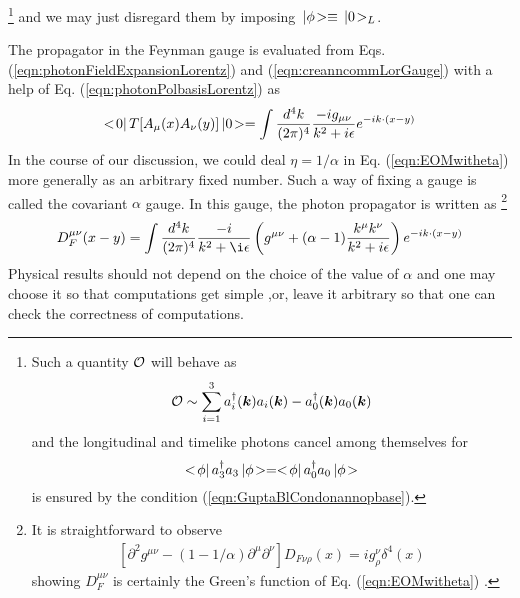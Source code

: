 \footnote{%
Such a quantity ${\cal O}$ will behave as
\begin{eqnarray*}
{\cal O} \sim \sum_{i = 1}^3 a^\dagger_i(\mbox{\boldmath $k$}) a_i(\mbox{\boldmath $k$})
-
a^\dagger_0(\mbox{\boldmath $k$}) a_0(\mbox{\boldmath $k$})
\end{eqnarray*}
and the longitudinal and timelike photons cancel among themselves
for 
\[<\! \phi |\, a_3^\dagger a_3 \,| \phi \!>
=<\! \phi |\, a_0^\dagger a_0 \,| \phi \!>
\]
is ensured by the condition (\ref{eqn:GuptaBlCondonannopbase}).
}%
 and we may just disregard
them by imposing $\,| \phi \!> \equiv \,| 0 \!>_L$.

The propagator in the Feynman gauge is evaluated from
Eqs. (\ref{eqn:photonFieldExpansionLorentz}) and (\ref{eqn:creanncommLorGauge})
with a help of Eq. (\ref{eqn:photonPolbasisLorentz}) as
\begin{eqnarray}
<\! 0 |\,
T[
A_\mu (x) A_\nu (y) ]
\,| 0 \!>
=
\int
\frac{d^4 k}{(2\pi)^4}
\frac{-i g_{\mu \nu}}
{k^2 + i\epsilon}
e^{-ik \cdot (x - y)}
\label{eqn:photonProp}
\end{eqnarray}
In the course of our discussion, we could deal $\eta = 1/\alpha$ 
in Eq. (\ref{eqn:EOMwitheta}) more generally as an arbitrary fixed number.
Such a way of fixing a gauge is called the covariant  $\alpha$ gauge.
In this gauge, the photon propagator is written as
\footnote{%
It is straightforward to observe
\begin{eqnarray}
\left[
\partial^2 g^{\mu \nu} - \left(
1 - 1/\alpha \right)
\partial^\mu \partial^\nu
\right]
D_{F\nu \rho}(x)
= i g^\nu_{\!\rho} \delta^4(x) 
\end{eqnarray}
showing $D_F^{\mu \nu}$ is certainly the Green's function of 
Eq. (\ref{eqn:EOMwitheta}) .
}%
\begin{eqnarray}
D_F^{\mu \nu}(x - y)
=
\int
\frac{d^4 k}{(2\pi)^4}
\frac{-i}
{k^2 + \i\epsilon}
\left(
g^{\mu \nu} + (\alpha - 1)
\frac{k^\mu k^\nu}{k^2+ i\epsilon}
\right)
e^{-ik \cdot (x - y)}
\label{eqn:photonPropalpha}
\end{eqnarray}
Physical results should not depend on the choice of the value of $\alpha$
and one may choose it so that computations get simple
,or, leave it arbitrary so that  one can check the correctness of computations.
